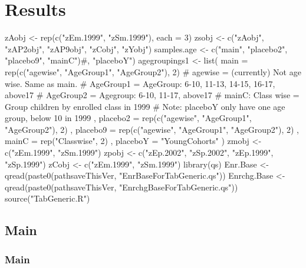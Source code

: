 \section{Results}

\begin{Schunk}
\begin{Sinput}
zAobj <- rep(c("zEm.1999", "zSm.1999"), each = 3)
zsobj <- c("zAobj", "zAP2obj", "zAP9obj", "zCobj", "zYobj")
samples.age <- c("main", "placebo2", "placebo9", "mainC")#, "placeboY")
agegroupings1 <- list(
    main = rep(c("agewise", "AgeGroup1", "AgeGroup2"), 2)
  # agewise = (currently) Not age wise. Same as main. 
  # AgeGroup1 = AgeGroup: 6-10, 11-13, 14-15, 16-17, above17
  # AgeGroup2 = Agegroup: 6-10, 11-17, above17
  # mainC: Class wise = Group children by enrolled class in 1999
  # Note: placeboY only have one age group, below 10 in 1999
  , placebo2 = rep(c("agewise", "AgeGroup1", "AgeGroup2"), 2)
  , placebo9 = rep(c("agewise", "AgeGroup1", "AgeGroup2"), 2)
  , mainC = rep("Classwise", 2)
  , placeboY = "YoungCohorts"
)
zmobj <- c("zEm.1999", "zSm.1999")
zpobj <- c("zEp.2002", "zSp.2002", "zEp.1999", "zSp.1999")
zCobj <- c("zEm.1999", "zSm.1999") 
library(qs)
Enr.Base <- qread(paste0(pathsaveThisVer, "EnrBaseForTabGeneric.qs"))
Enrchg.Base <- qread(paste0(pathsaveThisVer, "EnrchgBaseForTabGeneric.qs"))
source("TabGeneric.R")
\end{Sinput}
\end{Schunk}

\subsection{Main}


\subsubsection{Main}

